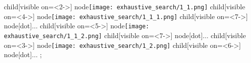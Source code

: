 
child[visible on=<2->]{
    node{\texttt{[image: exhaustive\_search/1\_1.png]}}
    child[visible on=<4->]{
        node{\texttt{[image: exhaustive\_search/1\_1\_1.png]}}
        child[visible on=<7->]{
            node[dot]{$\dots$}
        }
    } child[visible on=<5->]{
        node{\texttt{[image: exhaustive\_search/1\_1\_2.png]}}
        child[visible on=<7->]{
            node[dot]{$\dots$}
        }
    }
} child[visible on=<3->]{
    node{\texttt{[image: exhaustive\_search/1\_2.png]}}
    child[visible on=<6->]{
        node[dot]{$\dots$}
    }
};